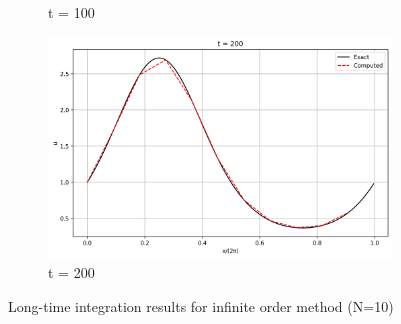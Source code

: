\documentclass{article}
\begin{document}
\begin{figure}[htbp]
\begin{subfigure}[b]{0.32\textwidth}
        \caption{t = 100}
    \end{subfigure}
    \begin{subfigure}[b]{0.32\textwidth}
        \includegraphics[width=\textwidth]{figures/long_time_infinite_200.png}
        \caption{t = 200}
    \end{subfigure}
    \caption{Long-time integration results for infinite order method (N=10)}
    \label{fig:long_time_infinite}
\end{figure}
\end{document}
